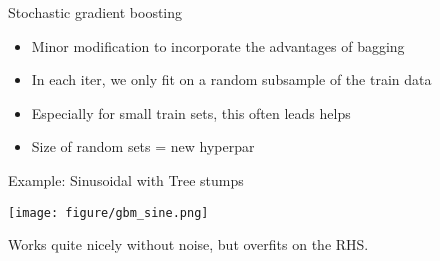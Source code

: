 \documentclass[11pt,compress,t,notes=noshow, xcolor=table]{beamer}
\begin{document}
\begin{vbframe}{Stochastic gradient boosting}

\begin{itemize}
\item Minor modification to incorporate the advantages of bagging
\item In each iter, we only fit on a random subsample of the train data
\item Especially for small train sets, this often leads helps
\item Size of random sets = new hyperpar

\end{itemize}

\end{vbframe}


\begin{vbframe}{Example: Sinusoidal with Tree stumps}



\begin{center}
  \texttt{[image: figure/gbm\_sine.png]}
\end{center}


Works quite nicely without noise, but overfits on the RHS.


\end{vbframe}



\end{document}

